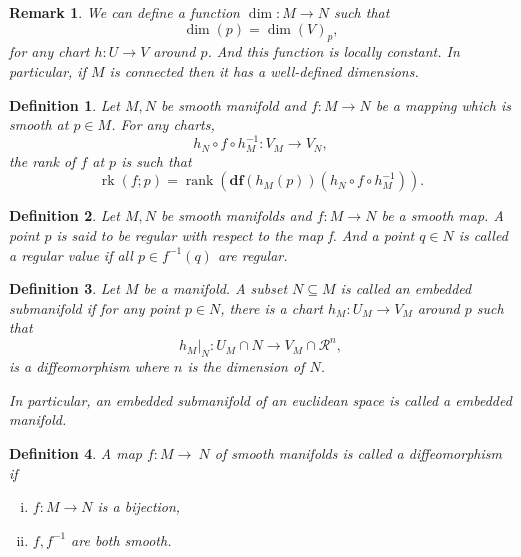 \documentclass{article}
\newtheorem{definition}{Definition}[section]
\newtheorem{remark}{Remark}[section]
\numberwithin{equation}{section}
\DeclareMathOperator{\rk}{rk}
\DeclareMathOperator{\rank}{rank}
\begin{document}
\begin{remark}
We can define a function $\dim:M\to N$ such that
\begin{equation*}
\dim(p)=\dim(V)_p,
\end{equation*}
for any chart $h:U\to V$ around $p$. And this function is locally constant. In particular, if $M$ is connected then it has a well-defined dimensions.
\end{remark}

\begin{definition}
Let $M,N$ be smooth manifold and $f:M\to N$ be a mapping which is smooth at $p\in M$. For any charts, 
\begin{equation*}
h_N\circ f \circ h_M^{-1}:V_M\to V_N,
\end{equation*}
the rank of $f$ at $p$ is such that
\begin{equation*}
\rk(f;p) = \rank(\mathbf{df}(h_M(p))(h_N\circ f\circ h^{-1}_M)).
\end{equation*}
\end{definition}

\begin{definition}
Let $M,N$ be smooth manifolds and $f:M\to N$ be a smooth map. A point $p$ is said to be regular with respect to the map f. And a point $q\in N$ is called a regular value if all $p\in f^{-1}(q)$ are regular.
\end{definition}

\begin{definition}
Let $M$ be a manifold. A subset $N\subseteq M $ is called an embedded submanifold if for any point $p\in N$, there is a chart $h_M:U_M\to V_M$ around $p$ such that
\begin{equation*}
h_M|_N:U_M\cap N\to V_M\cap \mathcal{R}^n,
\end{equation*}
 is a diffeomorphism where $n$ is the dimension of $N$.\\
 \par In particular, an embedded submanifold of an euclidean space is called a embedded manifold. 
\end{definition}

\begin{definition}
A map $f:M\to\ N$ of smooth manifolds is called a diffeomorphism if 
\begin{enumerate}[i).]
\item $f:M\to N$ is a bijection,
\item $f,f^{-1}$ are both smooth.
\end{enumerate}
\end{definition}
\end{document}
